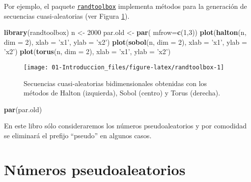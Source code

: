\documentclass[
]{book}
\newenvironment{Shaded}{\begin{snugshade}}{\end{snugshade}}
\newcommand{\DataTypeTok}[1]{\textcolor[rgb]{0.13,0.29,0.53}{#1}}
\newcommand{\DecValTok}[1]{\textcolor[rgb]{0.00,0.00,0.81}{#1}}
\newcommand{\KeywordTok}[1]{\textcolor[rgb]{0.13,0.29,0.53}{\textbf{#1}}}
\newcommand{\NormalTok}[1]{#1}
\newcommand{\StringTok}[1]{\textcolor[rgb]{0.31,0.60,0.02}{#1}}
\theoremstyle{break}
\theoremstyle{definition}
\theoremstyle{definition}
\theoremstyle{definition}
\theoremstyle{remark}
\begin{document}
Por ejemplo, el paquete \href{https://CRAN.R-project.org/package=randtoolbox}{\texttt{randtoolbox}} implementa métodos para la generación de secuencias cuasi-aleatorias (ver Figura \ref{fig:randtoolbox}).

\begin{Shaded}
\begin{Highlighting}[]
\KeywordTok{library}\NormalTok{(randtoolbox)}
\NormalTok{n <-}\StringTok{ }\DecValTok{2000}
\NormalTok{par.old <-}\StringTok{ }\KeywordTok{par}\NormalTok{( }\DataTypeTok{mfrow=}\KeywordTok{c}\NormalTok{(}\DecValTok{1}\NormalTok{,}\DecValTok{3}\NormalTok{))}
\KeywordTok{plot}\NormalTok{(}\KeywordTok{halton}\NormalTok{(n, }\DataTypeTok{dim =} \DecValTok{2}\NormalTok{), }\DataTypeTok{xlab =} \StringTok{'x1'}\NormalTok{, }\DataTypeTok{ylab =} \StringTok{'x2'}\NormalTok{)}
\KeywordTok{plot}\NormalTok{(}\KeywordTok{sobol}\NormalTok{(n, }\DataTypeTok{dim =} \DecValTok{2}\NormalTok{), }\DataTypeTok{xlab =} \StringTok{'x1'}\NormalTok{, }\DataTypeTok{ylab =} \StringTok{'x2'}\NormalTok{)}
\KeywordTok{plot}\NormalTok{(}\KeywordTok{torus}\NormalTok{(n, }\DataTypeTok{dim =} \DecValTok{2}\NormalTok{), }\DataTypeTok{xlab =} \StringTok{'x1'}\NormalTok{, }\DataTypeTok{ylab =} \StringTok{'x2'}\NormalTok{)}
\end{Highlighting}
\end{Shaded}

\begin{figure}[!htb]

{\centering \texttt{[image: 01-Introduccion\_files/figure-latex/randtoolbox-1]} 

}

\caption{Secuencias cuasi-aleatorias bidimensionales obtenidas con los métodos de Halton (izquierda), Sobol (centro) y Torus (derecha).}\label{fig:randtoolbox}
\end{figure}

\begin{Shaded}
\begin{Highlighting}[]
\KeywordTok{par}\NormalTok{(par.old)}
\end{Highlighting}
\end{Shaded}

En este libro sólo consideraremos los números pseudoaleatorios y por comodidad se eliminará el prefijo ``pseudo'' en algunos casos.

\hypertarget{nuxfameros-pseudoaleatorios}{%
\section{Números pseudoaleatorios}\label{nuxfameros-pseudoaleatorios}}
\end{document}
